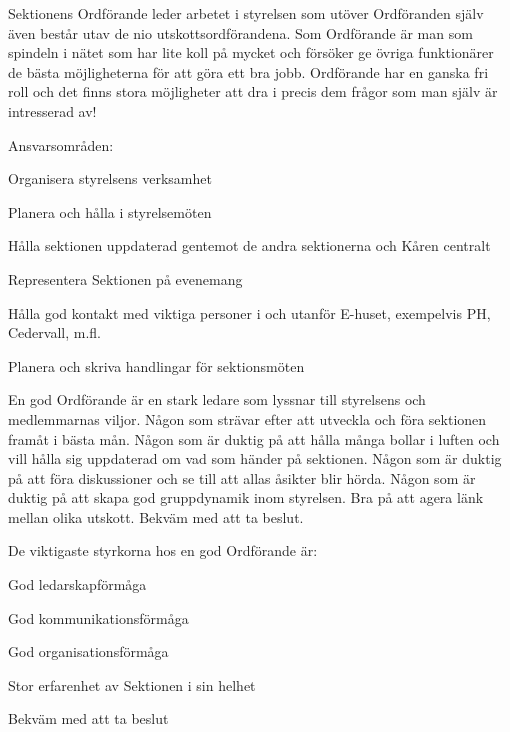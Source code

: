\documentclass[10pt]{article}
\def\post{Ordförande}
\def\doctitle{[UTKAST] Kravprofil för \post}
\begin{document}
\heading{\doctitle}


Sektionens Ordförande leder arbetet i styrelsen som utöver Ordföranden själv även består utav de nio utskottsordförandena.
Som Ordförande är man som spindeln i nätet som har lite koll på mycket och försöker ge övriga funktionärer de bästa möjligheterna för att göra ett bra jobb.
Ordförande har en ganska fri roll och det finns stora möjligheter att dra i precis dem frågor som man själv är intresserad av!


Ansvarsområden:
\begin{dashlist}
    \item Organisera styrelsens verksamhet
    \item Planera och hålla i styrelsemöten
    \item Hålla sektionen uppdaterad gentemot de andra sektionerna och Kåren centralt
    \item Representera Sektionen på evenemang
    \item Hålla god kontakt med viktiga personer i och utanför E-huset, exempelvis PH, Cedervall, m.fl.
    \item Planera och skriva handlingar för sektionsmöten
\end{dashlist}


En god Ordförande är en stark ledare som lyssnar till styrelsens och medlemmarnas viljor.
Någon som strävar efter att utveckla och föra sektionen framåt i bästa mån. 
Någon som är duktig på att hålla många bollar i luften och vill hålla sig uppdaterad om vad som händer på sektionen.
Någon som är duktig på att föra diskussioner och se till att allas åsikter blir hörda.
Någon som är duktig på att skapa god gruppdynamik inom styrelsen.
Bra på att agera länk mellan olika utskott.
Bekväm med att ta beslut.




De viktigaste styrkorna hos en god Ordförande är:
\begin{dashlist}
    \item God ledarskapförmåga
    \item God kommunikationsförmåga
    \item God organisationsförmåga
    \item Stor erfarenhet av Sektionen i sin helhet
    \item Bekväm med att ta beslut
\end{dashlist}
\end{document}
